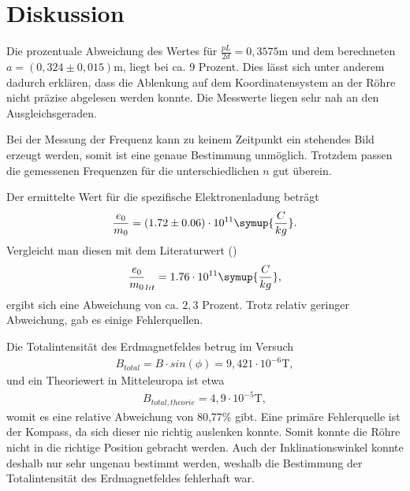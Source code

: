 \section{Diskussion}
\label{sec:Diskussion}

Die prozentuale Abweichung des Wertes für $\frac{pL}{2d} = 0,3575 \si{\meter} $ und dem berechneten $a = (0,324 \pm 0,015)  \si{\meter}$, liegt bei ca. $9$ Prozent.
Dies lässt sich unter anderem dadurch erklären, dass die Ablenkung auf dem Koordinatensystem an der Röhre nicht präzise abgelesen werden konnte.
Die Messwerte liegen sehr nah an den Ausgleichsgeraden.

\noindent Bei der Messung der Frequenz kann zu keinem Zeitpunkt ein stehendes Bild erzeugt werden, somit ist eine genaue Bestimmung unmöglich. 
Trotzdem passen die gemessenen Frequenzen für die unterschiedlichen $n$ gut überein.

\noindent 
Der ermittelte Wert für die spezifische Elektronenladung beträgt 
\begin{align*}
\frac{e_0}{m_0} = (1.72 \pm 0.06) \cdot 10^{11} \symup{\frac{C}{kg}} .
\end{align*}
Vergleicht man diesen mit dem Literaturwert (\cite{kent3})
\begin{align*}
\frac{e_0}{m_0}_{lit} = 1.76 \cdot 10^{11} \symup{\frac{C}{kg}},
\end{align*}
ergibt sich eine Abweichung von ca. $2,3$ Prozent. Trotz relativ geringer Abweichung, gab es einige Fehlerquellen.

Die Totalintensität des Erdmagnetfeldes betrug im Versuch 
\begin{align*}
B_{total} = B \cdot sin(\phi) = 9,421 \cdot 10^{-6} \si{\tesla},
\end{align*}
und ein Theoriewert in Mitteleuropa\cite{kent4} ist etwa
\begin{align*}
B_{total,theorie} =  4,9 \cdot 10^{-5} \si{\tesla},
\end{align*}
womit es eine relative Abweichung von 80,77\% gibt.
Eine primäre Fehlerquelle ist der Kompass, da sich dieser nie richtig auslenken konnte.
Somit konnte die Röhre nicht in die richtige Position gebracht werden. 
Auch der Inklinationswinkel konnte deshalb nur sehr ungenau bestimmt werden, weshalb die Bestimmung der Totalintensität des Erdmagnetfeldes fehlerhaft war.